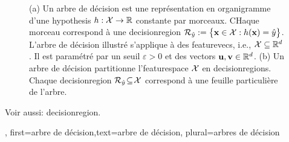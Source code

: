 {{\begin{figure}[H]
\begin{minipage}{.45\textwidth}
			\end{minipage}
			\caption{(a) Un arbre de décision est une représentation en organigramme d'une \gls{hypothesis} $h: \mathcal{X} \rightarrow \mathbb{R}$ constante par morceaux.  
				CHaque morceau correspond à une \gls{decisionregion} $\mathcal{R}_{\hat{y}} := \big\{ {\bf x} \in  \mathcal{X}: h({\bf x}) = \hat{y} \big\}$. 
				L'arbre de décision illustré s'applique à des \glspl{featurevec}, i.e., $\mathcal{X} \subseteq \mathbb{R}^{d}$. Il est paramétré par un seuil $\varepsilon>0$ et des \glspl{vector} ${\bf u}, {\bf v} \in \mathbb{R}^{d}$. 
				(b) Un arbre de décision partitionne l'\gls{featurespace} $\mathcal{X}$ en \glspl{decisionregion}. Chaque \gls{decisionregion}  
				$\mathcal{R}_{\hat{y}} \!\subseteq\!\mathcal{X}$ correspond à une feuille particulière de l'arbre.}
			\label{fig_decision_tree_dict}
		\end{figure} 
	Voir aussi: \gls{decisionregion}.
	},
	first={arbre de décision},text={arbre de décision}, plural={arbres de décision}
}

